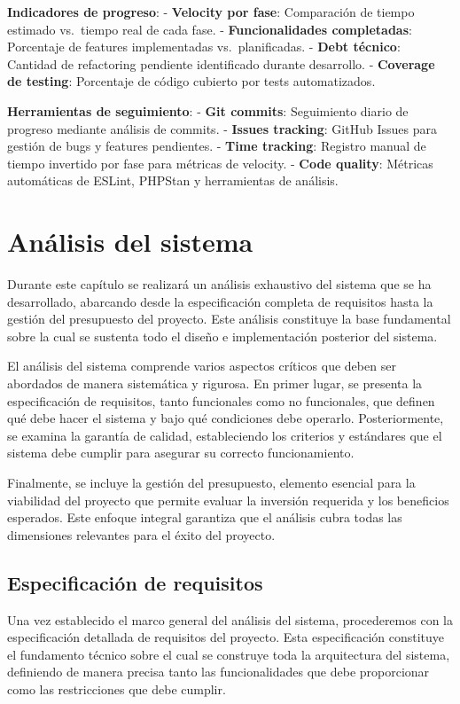 \documentclass[12pt,a4paper,oneside]{report}
\begin{document}
\textbf{Indicadores de progreso}: - \textbf{Velocity por fase}:
Comparación de tiempo estimado vs.~tiempo real de cada fase. -
\textbf{Funcionalidades completadas}: Porcentaje de features
implementadas vs.~planificadas. - \textbf{Debt técnico}: Cantidad de
refactoring pendiente identificado durante desarrollo. -
\textbf{Coverage de testing}: Porcentaje de código cubierto por tests
automatizados.

\textbf{Herramientas de seguimiento}: - \textbf{Git commits}:
Seguimiento diario de progreso mediante análisis de commits. -
\textbf{Issues tracking}: GitHub Issues para gestión de bugs y features
pendientes. - \textbf{Time tracking}: Registro manual de tiempo
invertido por fase para métricas de velocity. - \textbf{Code quality}:
Métricas automáticas de ESLint, PHPStan y herramientas de análisis.

\chapter{Análisis del sistema}\label{anuxe1lisis-del-sistema}
Durante este capítulo se realizará un análisis exhaustivo del sistema
que se ha desarrollado, abarcando desde la especificación completa de
requisitos hasta la gestión del presupuesto del proyecto. Este análisis
constituye la base fundamental sobre la cual se sustenta todo el diseño
e implementación posterior del sistema.

El análisis del sistema comprende varios aspectos críticos que deben ser
abordados de manera sistemática y rigurosa. En primer lugar, se presenta
la especificación de requisitos, tanto funcionales como no funcionales,
que definen qué debe hacer el sistema y bajo qué condiciones debe
operarlo. Posteriormente, se examina la garantía de calidad,
estableciendo los criterios y estándares que el sistema debe cumplir
para asegurar su correcto funcionamiento.

Finalmente, se incluye la gestión del presupuesto, elemento esencial
para la viabilidad del proyecto que permite evaluar la inversión
requerida y los beneficios esperados. Este enfoque integral garantiza
que el análisis cubra todas las dimensiones relevantes para el éxito del
proyecto.

\section{Especificación de
requisitos}\label{especificaciuxf3n-de-requisitos}

Una vez establecido el marco general del análisis del sistema,
procederemos con la especificación detallada de requisitos del proyecto.
Esta especificación constituye el fundamento técnico sobre el cual se
construye toda la arquitectura del sistema, definiendo de manera precisa
tanto las funcionalidades que debe proporcionar como las restricciones
que debe cumplir.
\end{document}
